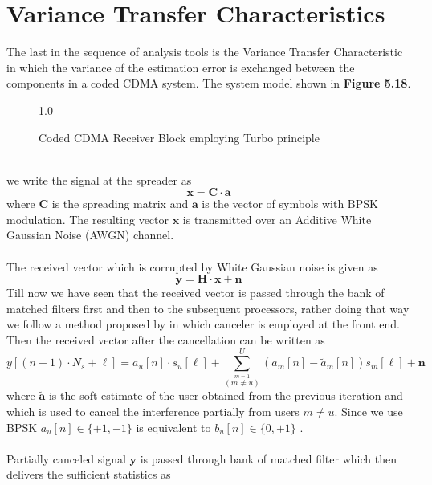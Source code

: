 \section{Variance Transfer Characteristics}
The last in the sequence of analysis tools is the Variance Transfer Characteristic in which the variance of the estimation error is exchanged between the components in a  coded CDMA system.
The system model shown in \textbf{Figure 5.18}.
\begin{figure}[htb]
\centerline{  {1.0} }
\caption{Coded CDMA Receiver Block employing Turbo principle}
\end{figure}\\
we write the signal at the spreader as
\begin{equation}
\mathrm{\mathbf{x}}=\mathrm{\mathbf{C}}\cdot\mathrm{\mathbf{a}}
\end{equation}
where $\mathrm{\mathbf{C}}$ is the spreading matrix and $\mathrm{\mathbf{a}}$ is the vector of symbols with BPSK modulation. The resulting vector $\mathrm{\mathbf{x}}$ is transmitted over an Additive White Gaussian Noise (AWGN) channel.\\ \\
The received vector which is corrupted by White Gaussian noise is given as
\begin{equation}
\mathrm{\mathbf{y}}=\mathrm{\mathbf{H}}\cdot\mathrm{\mathbf{x}}+\mathrm{\mathbf{n}}
\end{equation}
Till now we have seen that the received vector is passed through the bank of matched filters first and then to the subsequent processors, rather doing that way we follow a method proposed by \cite{JC} in which canceler is employed at the front end. Then the received vector after the cancellation can be written as
\begin{equation}
{{y}}[(n-1)\cdot N_s+\ell]={{a}}_u[n]\cdot{{s}}_u[\ell]+\sum\limits_{\stackrel{m=1}{(m\neq u)}}^U\left({{a}}_m[n]-{{\tilde{a}}}_m[n]\right){{s}}_m[\ell]+\mathrm{\mathbf{n}}
\end{equation}
where $\mathrm{\mathbf{\tilde{a}}}$ is the soft estimate of the user obtained from the previous iteration and which is used to cancel the interference partially from users $m \neq u$. Since we use BPSK $a_u[n]\in \{+1,-1\}$ is equivalent to $b_u[n]\in\{0,+1\}$ \cite{K05}.\\ \\
Partially canceled signal $\mathrm{\mathbf{y}}$ is passed through bank of matched filter which then delivers the sufficient statistics as
